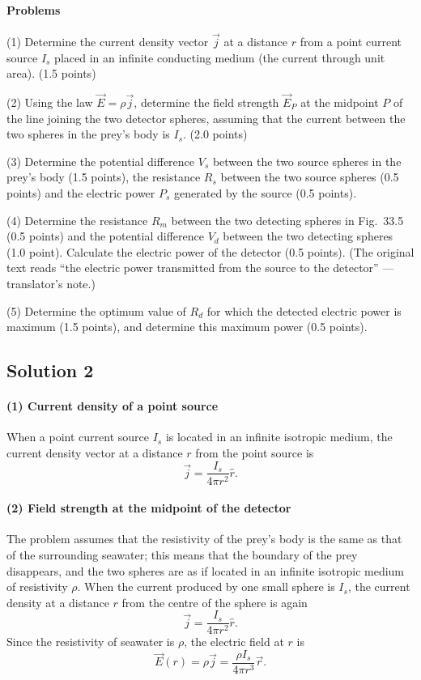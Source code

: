 \paragraph{Problems}

(1) Determine the current density vector $\vec{j}$ at a distance $r$ from a point current source $I_s$ placed in an infinite conducting medium (the current through unit area). (1.5 points)

(2) Using the law $\vec{E}=\rho\vec{j}$, determine the field strength $\vec{E}_P$ at the midpoint $P$ of the line joining the two detector spheres, assuming that the current between the two spheres in the prey's body is $I_s$. (2.0 points)

(3) Determine the potential difference $V_s$ between the two source spheres in the prey's body (1.5 points), the resistance $R_s$ between the two source spheres (0.5 points) and the electric power $P_s$ generated by the source (0.5 points).

(4) Determine the resistance $R_m$ between the two detecting spheres in Fig.~33.5 (0.5 points) and the potential difference $V_d$ between the two detecting spheres (1.0 point). Calculate the electric power of the detector (0.5 points). (The original text reads ``the electric power transmitted from the source to the detector'' --- translator's note.)

(5) Determine the optimum value of $R_d$ for which the detected electric power is maximum (1.5 points), and determine this maximum power (0.5 points).

\subsection*{Solution 2}

\paragraph{(1) Current density of a point source}

When a point current source $I_s$ is located in an infinite isotropic medium, the current density vector at a distance $r$ from the point source is
\[
\vec{j}=\frac{I_s}{4\pi r^2}\hat{r}.
\]

\paragraph{(2) Field strength at the midpoint of the detector}

The problem assumes that the resistivity of the prey's body is the same as that of the surrounding seawater; this means that the boundary of the prey disappears, and the two spheres are as if located in an infinite isotropic medium of resistivity $\rho$. When the current produced by one small sphere is $I_s$, the current density at a distance $r$ from the centre of the sphere is again
\[
\vec{j}=\frac{I_s}{4\pi r^2}\hat{r}.
\]
Since the resistivity of seawater is $\rho$, the electric field at $r$ is
\[
\vec{E}(r)=\rho\vec{j}=\frac{\rho I_s}{4\pi r^3}\vec{r}.
\]

